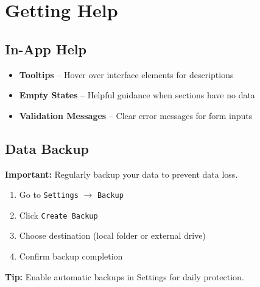 \documentclass[12pt,a4paper]{report}
\begin{document}
\chapter{Getting Help}

\section{In-App Help}

\begin{itemize}[leftmargin=*]
    \item \textbf{Tooltips} -- Hover over interface elements for descriptions
    \item \textbf{Empty States} -- Helpful guidance when sections have no data
    \item \textbf{Validation Messages} -- Clear error messages for form inputs
\end{itemize}

\section{Data Backup}

\textbf{Important:} Regularly backup your data to prevent data loss.

\begin{enumerate}[leftmargin=*]
    \item Go to \texttt{Settings} $\rightarrow$ \texttt{Backup}
    \item Click \texttt{Create Backup}
    \item Choose destination (local folder or external drive)
    \item Confirm backup completion
\end{enumerate}

\textbf{Tip:} Enable automatic backups in Settings for daily protection.
\end{document}

